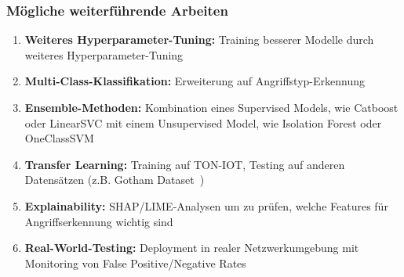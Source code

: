 \documentclass[12pt,oneside]{article}
\begin{document}
	\subsubsection{Mögliche weiterführende Arbeiten}
	\begin{enumerate}
		\item \textbf{Weiteres Hyperparameter-Tuning:} Training besserer Modelle durch weiteres Hyperparameter-Tuning
		
		\item \textbf{Multi-Class-Klassifikation:} Erweiterung auf Angriffstyp-Erkennung
		
		\item \textbf{Ensemble-Methoden:} Kombination eines Supervised Models, wie Catboost oder LinearSVC mit einem Unsupervised Model, wie Isolation Forest oder OneClassSVM
		
		\item \textbf{Transfer Learning:} Training auf TON-IOT, Testing auf anderen Datensätzen (z.B. Gotham Dataset~\cite{belarbi2025})
		
		\item \textbf{Explainability:} SHAP/LIME-Analysen um zu prüfen, welche Features für Angriffserkennung wichtig sind
		
		\item \textbf{Real-World-Testing:} Deployment in realer Netzwerkumgebung mit Monitoring von False Positive/Negative Rates
	\end{enumerate}

\end{document}
